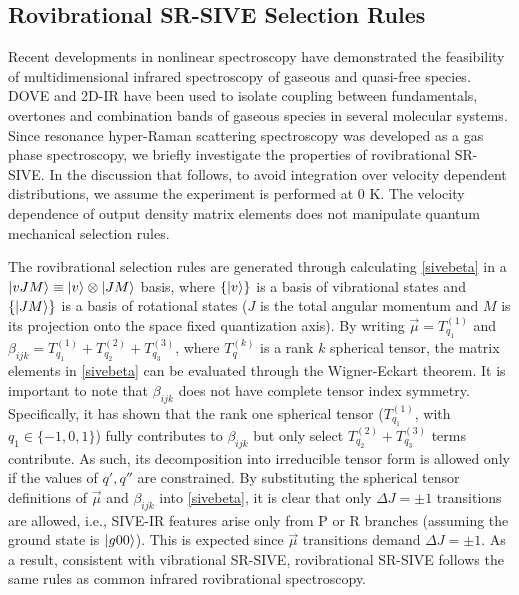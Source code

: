 \documentclass[aip, jcp, draft, onecolumn]{revtex4-2}
\begin{document}
\subsection{Rovibrational SR-SIVE Selection Rules} %
Recent developments in nonlinear spectroscopy have demonstrated the feasibility of multidimensional infrared spectroscopy of gaseous and quasi-free species. \cite{Ziegler2018, Gronborg2022, RN325, Chen2024}
DOVE and 2D-IR have been used to isolate coupling between fundamentals, overtones and combination bands of gaseous species in several molecular systems. 
Since resonance hyper-Raman scattering spectroscopy was developed as a gas phase spectroscopy,\cite{RN515} we briefly investigate the properties of rovibrational SR-SIVE.
In the discussion that follows, to avoid integration over velocity dependent distributions, we assume the experiment is performed at 0 K.
The velocity dependence of output density matrix elements does not manipulate quantum mechanical selection rules. \cite{Bracamonte2003}

The rovibrational selection rules are generated through calculating \autoref{sivebeta} in a $\ket{vJM} \equiv \ket{v} \otimes {\ket{JM}}$ basis, where $\{\ket{v}\}$ is a basis of vibrational states and $\{\ket{JM}\}$ is a basis of rotational states ($J$ is the total angular momentum and $M$ is its projection onto the space fixed quantization axis).
By writing $\vec{\mu} = T_{q_1}^{(1)}$ and $\beta_{ijk} = T_{q_1}^{(1)} + T_{q_2}^{(2)} + T_{q_3}^{(3)}$, where $T^{(k)}_{q}$ is a rank $k$ spherical tensor, the matrix elements in \autoref{sivebeta} can be evaluated through the Wigner-Eckart theorem.
It is important to note that $\beta_{ijk}$ does not have complete tensor index symmetry.\cite{Andrews1978}
Specifically, it has shown that the rank one spherical tensor ($T_{q_1}^{(1)}$, with $q_1 \in \{-1, 0 ,1\}$) fully contributes to $\beta_{ijk}$ but only select $T_{q_2}^{(2)} + T_{q_3}^{(3)}$ terms contribute. \cite{Andrews1978, Andrews1990}
As such, its decomposition into irreducible tensor form is allowed only if the values of $q', q''$ are constrained.
By substituting the spherical tensor definitions of $\vec{\mu}$ and $\beta_{ijk}$ into \autoref{sivebeta}, it is clear that only $\Delta J = \pm 1$ transitions are allowed, i.e., SIVE-IR features arise only from P or R branches (assuming the ground state is $\ket{g00}$).
This is expected since $\vec{\mu}$ transitions demand $\Delta J = \pm 1$.
As a result, consistent with vibrational SR-SIVE, rovibrational SR-SIVE follows the same rules as common infrared rovibrational spectroscopy.
\end{document}
